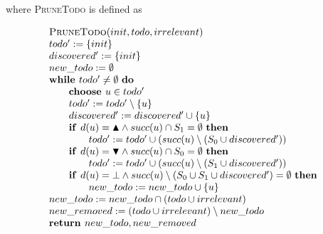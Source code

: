 \documentclass{article}
\newcommand{\Space}{\text{\ }}
\newcommand{\If}{\text{\textbf{if }}}
\newcommand{\Do}{\text{\textbf{do }}}
\newcommand{\Then}{\text{\textbf{then }}}
\newcommand{\While}{\text{\textbf{while }}}
\newcommand{\Choose}{\text{\textbf{choose }}}
\newcommand{\Return}{\text{\textbf{return }}}
\begin{document}
where \textsc{PruneTodo} is defined as

\begin{equation*}
\begin{array}{l}
\textsc{PruneTodo}(init, todo, irrelevant) \\ 
todo' := \{init\} \\
discovered' := \{init\} \\
new\_todo := \emptyset \\
\While todo' \neq \emptyset \Space \Do \\
\qquad \Choose u \in todo' \\
\qquad todo' := todo' \setminus \{ u \} \\
\qquad discovered' := discovered' \cup \{ u \} \\
\qquad \If d(u) = \blacktriangle \wedge succ(u) \cap S_1 = \emptyset \Space \Then \\
\qquad \qquad todo' := todo' \cup (succ(u) \setminus (S_0 \cup discovered')) \\
\qquad \If d(u) = \blacktriangledown \wedge succ(u) \cap S_0 = \emptyset \Space \Then \\
\qquad \qquad todo' := todo' \cup (succ(u) \setminus (S_1 \cup discovered')) \\
\qquad \If d(u) = \bot \wedge succ(u) \setminus (S_0 \cup S_1 \cup discovered') = \emptyset \Space \Then \\
\qquad \qquad new\_todo := new\_todo \cup \{ u \} \\
new\_todo := new\_todo \cap (todo \cup irrelevant) \\
new\_removed := (todo \cup irrelevant) \setminus new\_todo \\
\Return new\_todo, new\_removed
\end{array}
\end{equation*}
\end{document}
